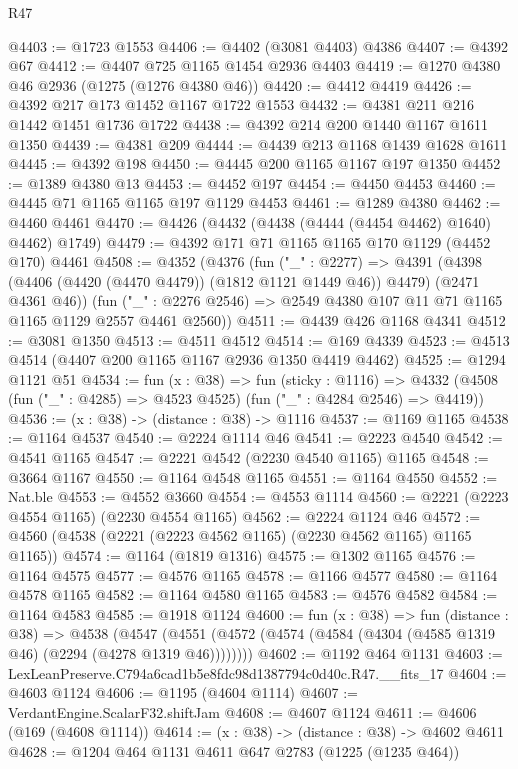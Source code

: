 \begin{lexlean}{R47}
\begin{coremodule}
@4403 := @1723 @1553
@4406 := @4402 (@3081 @4403) @4386
@4407 := @4392 @67
@4412 := @4407 @725 @1165 @1454 @2936 @4403
@4419 := @1270 @4380 @46 @2936 (@1275 (@1276 @4380 @46))
@4420 := @4412 @4419
@4426 := @4392 @217 @173 @1452 @1167 @1722 @1553
@4432 := @4381 @211 @216 @1442 @1451 @1736 @1722
@4438 := @4392 @214 @200 @1440 @1167 @1611 @1350
@4439 := @4381 @209
@4444 := @4439 @213 @1168 @1439 @1628 @1611
@4445 := @4392 @198
@4450 := @4445 @200 @1165 @1167 @197 @1350
@4452 := @1389 @4380 @13
@4453 := @4452 @197
@4454 := @4450 @4453
@4460 := @4445 @71 @1165 @1165 @197 @1129 @4453
@4461 := @1289 @4380
@4462 := @4460 @4461
@4470 := @4426 (@4432 (@4438 (@4444 (@4454 @4462) @1640) @4462) @1749)
@4479 := @4392 @171 @71 @1165 @1165 @170 @1129 (@4452 @170) @4461
@4508 := @4352
    (@4376
      (fun ("_" : @2277) =>
      @4391 (@4398 (@4406 (@4420 (@4470 @4479)) (@1812 @1121 @1449 @46)) @4479) (@2471 @4361 @46))
      (fun ("_" : @2276 @2546) => @2549 @4380 @107 @11 @71 @1165 @1165 @1129 @2557 @4461 @2560))
@4511 := @4439 @426 @1168 @4341
@4512 := @3081 @1350
@4513 := @4511 @4512
@4514 := @169 @4339
@4523 := @4513 @4514 (@4407 @200 @1165 @1167 @2936 @1350 @4419 @4462)
@4525 := @1294 @1121 @51
@4534 := fun (x : @38) =>
  fun (sticky : @1116) =>
  @4332 (@4508 (fun ("_" : @4285) => @4523 @4525) (fun ("_" : @4284 @2546) => @4419))
@4536 := (x : @38) -> (distance : @38) -> @1116
@4537 := @1169 @1165
@4538 := @1164 @4537
@4540 := @2224 @1114 @46
@4541 := @2223 @4540
@4542 := @4541 @1165
@4547 := @2221 @4542 (@2230 @4540 @1165) @1165
@4548 := @3664 @1167
@4550 := @1164 @4548 @1165
@4551 := @1164 @4550
@4552 := Nat.ble
@4553 := @4552 @3660
@4554 := @4553 @1114
@4560 := @2221 (@2223 @4554 @1165) (@2230 @4554 @1165)
@4562 := @2224 @1124 @46
@4572 := @4560 (@4538 (@2221 (@2223 @4562 @1165) (@2230 @4562 @1165) @1165 @1165))
@4574 := @1164 (@1819 @1316)
@4575 := @1302 @1165
@4576 := @1164 @4575
@4577 := @4576 @1165
@4578 := @1166 @4577
@4580 := @1164 @4578 @1165
@4582 := @1164 @4580 @1165
@4583 := @4576 @4582
@4584 := @1164 @4583
@4585 := @1918 @1124
@4600 := fun (x : @38) =>
  fun (distance : @38) =>
  @4538 (@4547 (@4551 (@4572 (@4574 (@4584 (@4304 (@4585 @1319 @46) (@2294 (@4278 @1319 @46))))))))
@4602 := @1192 @464 @1131
@4603 := LexLeanPreserve.C794a6cad1b5e8fdc98d1387794c0d40c.R47.__fits_17
@4604 := @4603 @1124
@4606 := @1195 (@4604 @1114)
@4607 := VerdantEngine.ScalarF32.shiftJam
@4608 := @4607 @1124
@4611 := @4606 (@169 (@4608 @1114))
@4614 := (x : @38) -> (distance : @38) -> @4602 @4611
@4628 := @1204
    @464
    @1131
    @4611
    @647
    @2783
    (@1225 (@1235 @464))

\end{coremodule}
\end{lexlean}
